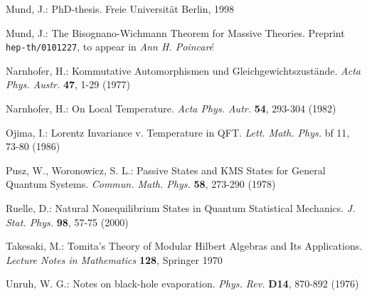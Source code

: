 \documentclass[a4paper,11pt]{article}
\begin{document}
\begin{thebibliography}{*****}
 Mund, J.: PhD-thesis. Freie Universit\"at Berlin, 1998

 Mund, J.: The Bisognano-Wichmann Theorem for Massive
Theories. Preprint {\tt hep-th/0101227}, to appear in {\it Ann H. Poincar\'e}

 Narnhofer, H.: Kommutative Automorphismen und
Gleichge\-wichts\-zust\"ande. {\it Acta Phys. Austr.} {\bf 47}, 1-29 (1977)

 Narnhofer, H.: On Local Temperature. {\it Acta Phys. Autr.} {\bf 54},
293-304 (1982)

 Ojima, I.: Lorentz Invariance v. Temperature in
QFT. {\it Lett. Math. Phys.} {bf 11}, 73-80 (1986)




 Pusz, W., Woronowicz, S. L.: Passive States and KMS States for
General Quantum Systems. {\it Commun. Math. Phys.} {\bf 58}, 273-290 (1978)


 Ruelle, D.: Natural Nonequilibrium States in Quantum
Statistical Mechanics. {\it J. Stat. Phys. } {\bf 98}, 57-75 (2000)




 Takesaki, M.: Tomita's Theory of Modular Hilbert Algebras
and Its Applications. {\it Lecture Notes in Mathematics} {\bf 128}, Springer 1970


 Unruh, W. G.: Notes on black-hole evaporation. {\it Phys. Rev.}
{\bf D14}, 870-892 (1976)


\end{thebibliography}
\end{document}

